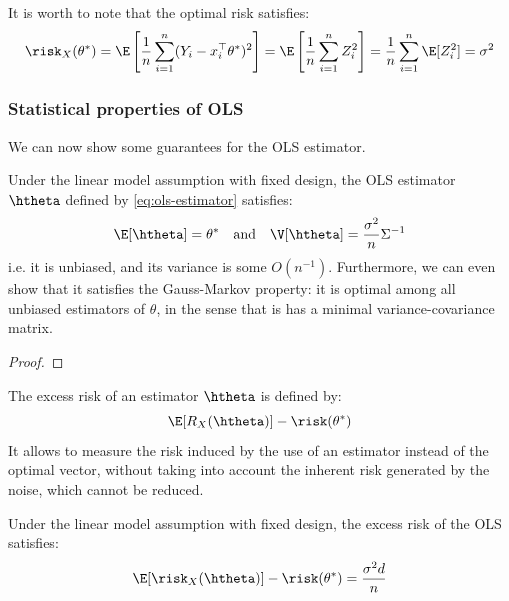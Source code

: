 \documentclass[toc]{../cs-classes/cs-classes}
\begin{document}
\begin{remark}
    It is worth to note that the optimal risk satisfies:
    \begin{equation*}
        \risk_X(\theta^*) = \E\left[\frac{1}{n}\sum_{i=1}^n(Y_i-x_i^\top\theta^*)^2\right] = \E\left[\frac{1}{n}\sum_{i=1}^nZ_i^2\right] = \frac{1}{n}\sum_{i=1}^n\E[Z_i^2]=\sigma^2
    \end{equation*}
\end{remark}

\subsubsection{Statistical properties of OLS}
We can now show some guarantees for the OLS estimator.

\begin{property}
    Under the linear model assumption with fixed design, the OLS estimator $\htheta$ defined by \eqref{eq:ols-estimator} satisfies:
    \begin{equation*}
        \E[\htheta] = \theta^* \quad \textnormal{and} \quad \V[\htheta] = \frac{\sigma^2}{n}\Sigma^{-1}
    \end{equation*}
    i.e. it is unbiased, and its variance is some $O(n^{-1})$. Furthermore, we can even show that it satisfies the Gauss-Markov property: it is optimal among all unbiased estimators of $\theta$, in the sense that is has a minimal variance-covariance matrix.
\end{property}

\begin{proof}
\end{proof}

\begin{definition}
    The excess risk of an estimator $\htheta$ is defined by:
    \begin{equation}
        \E[R_X(\htheta)]-\risk(\theta^*)
    \end{equation}
    It allows to measure the risk induced by the use of an estimator instead of the optimal vector, without taking into account the inherent risk generated by the noise, which cannot be reduced.
\end{definition}

\begin{corollary}
    Under the linear model assumption with fixed design, the excess risk of the OLS satisfies:
    \begin{equation*}
        \E[\risk_X(\htheta)]-\risk(\theta^*)=\frac{\sigma^2d}{n}
    \end{equation*}
\end{corollary}
\end{document}
